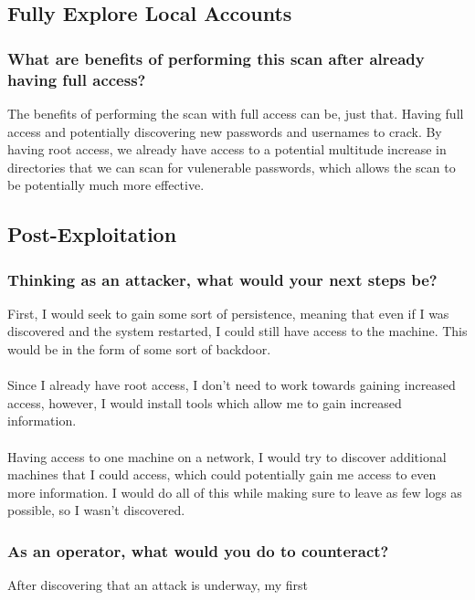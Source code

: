 \subsection{Fully Explore Local Accounts}
\subsubsection{What are benefits of performing this scan after already having full access?}
The benefits of performing the scan with full access can be, just that. Having full access and potentially discovering new passwords and usernames to crack. By having root access, we already have access to a potential multitude increase in directories that we can scan for vulenerable passwords, which allows the scan to be potentially much more effective.

\subsection{Post-Exploitation}
\subsubsection{Thinking as an attacker, what would your next steps be?}
First, I would seek to gain some sort of persistence, meaning that even if I was discovered and the system restarted, I could still have access to the machine. This would be in the form of some sort of backdoor.
\\\\
Since I already have root access, I don't need to work towards gaining increased access, however, I would install tools which allow me to gain increased information.
\\\\
Having access to one machine on a network, I would try to discover additional machines that I could access, which could potentially gain me access to even more information. I would do all of this while making sure to leave as few logs as possible, so I wasn't discovered.
\subsubsection{As an operator, what would you do to counteract?}
After discovering that an attack is underway, my first